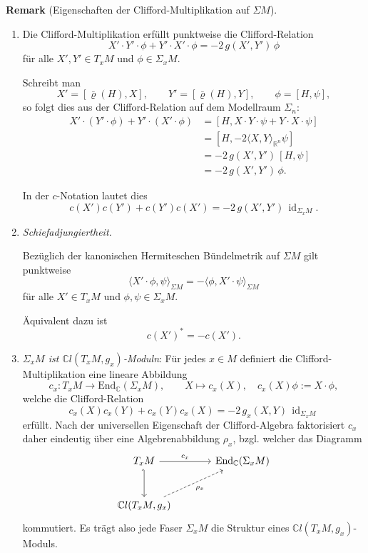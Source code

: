 \documentclass[10pt, letterpaper]{article}
\newcommand{\id}{\operatorname{id}}
\newcommand{\R}{\mathbb{R}}
\newcommand{\C}{\mathbb{C}}
\newcommand{\End}{\mathrm{End}}
\newcommand{\CustomHeading}[3]{%
  \par\medskip\noindent%
  \textbf{#1 #2} \textnormal{(#3)}.\enskip%
}
\newenvironment{REM}[2]{\CustomHeading{Remark}{#1}{#2}}{}
\begin{document}
\begin{REM}{}{Eigenschaften der Clifford-Multiplikation auf $\Sigma M$}
\begin{enumerate}
  \item Die Clifford-Multiplikation erfüllt punktweise die Clifford-Relation
    \[
    X'\cdot Y'\cdot \phi + Y'\cdot X'\cdot \phi
    =
    -2\,g(X',Y')\,\phi
    \]
    für alle \(X',Y'\in T_xM\) und \(\phi\in \Sigma_xM\).

    Schreibt man
    \[
    X'=[\bar\varrho(H),X],\qquad
    Y'=[\bar\varrho(H),Y],\qquad
    \phi=[H,\psi],
    \]
    so folgt dies aus der Clifford-Relation auf dem Modellraum \(\Sigma_n\):
    \[
    \begin{aligned}
    X'\cdot (Y'\cdot \phi)+Y'\cdot (X'\cdot \phi)
    &=
    [H,X\cdot Y\cdot \psi + Y\cdot X\cdot \psi] \\
    &=
    [H,-2\langle X,Y\rangle_{\R^n}\psi] \\
    &=
    -2\,g(X',Y')\,[H,\psi] \\
    &=
    -2\,g(X',Y')\,\phi.
    \end{aligned}
    \]

    In der \(c\)-Notation lautet dies
    \[
    c(X')c(Y')+c(Y')c(X')
    =
    -2\,g(X',Y')\,\id_{\Sigma_xM}.
    \]

  \item \emph{Schiefadjungiertheit.}
  
  Bezüglich der kanonischen Hermiteschen Bündelmetrik auf \(\Sigma M\) gilt
  punktweise
  \[
  \langle X'\cdot \phi,\psi\rangle_{\Sigma M}
  =
  -\langle \phi, X'\cdot \psi\rangle_{\Sigma M}
  \]
  für alle \(X'\in T_xM\) und \(\phi,\psi\in \Sigma_xM\).

  Äquivalent dazu ist
  \[
  c(X')^*=-c(X').
  \]

  \item \emph{$\Sigma_xM$ ist $\C l(T_xM,g_x)$-Moduln}: Für jedes \(x\in M\) definiert die Clifford-Multiplikation eine lineare Abbildung
  \[
  c_x:T_xM\to \End_{\C}(\Sigma_xM),\qquad X\mapsto c_x(X),\quad c_x(X)\phi:=X\cdot \phi,
  \]
  welche die Clifford-Relation
  \[
  c_x(X)c_x(Y)+c_x(Y)c_x(X)=-2\,g_x(X,Y)\,\id_{\Sigma_xM}
  \]
  erfüllt. Nach der universellen Eigenschaft der Clifford-Algebra faktorisiert \(c_x\)
  daher eindeutig über eine Algebrenabbildung $\rho_x$, bzgl. welcher das Diagramm
  \[
  \begin{tikzcd}[column sep=large, row sep=large]
  T_xM \arrow[r,"c_x"] \arrow[d,hook'] & \End_{\C}(\Sigma_xM) \\
  \C l(T_xM,g_x) \arrow[ur,dashed,"\rho_x"']
  \end{tikzcd}
  \]
  kommutiert. Es trägt also jede Faser \(\Sigma_xM\) die Struktur eines \(\C l(T_xM,g_x)\)-Moduls.
  

\end{enumerate}
\end{REM}
\end{document}
